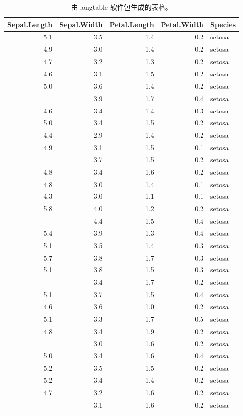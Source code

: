 \documentclass[
  12pt,
]{krantz}
\theoremstyle{definition}
\theoremstyle{definition}
\theoremstyle{definition}
\theoremstyle{definition}
\theoremstyle{remark}
\begin{document}
\begin{longtable}[t]{rrrrl}
\caption{\label{tab:longtable}由 longtable 软件包生成的表格。}\\
\toprule
Sepal.Length & Sepal.Width & Petal.Length & Petal.Width & Species\\
\midrule
5.1 & 3.5 & 1.4 & 0.2 & setosa\\
4.9 & 3.0 & 1.4 & 0.2 & setosa\\
4.7 & 3.2 & 1.3 & 0.2 & setosa\\
4.6 & 3.1 & 1.5 & 0.2 & setosa\\
5.0 & 3.6 & 1.4 & 0.2 & setosa\\
\addlinespace
5.4 & 3.9 & 1.7 & 0.4 & setosa\\
4.6 & 3.4 & 1.4 & 0.3 & setosa\\
5.0 & 3.4 & 1.5 & 0.2 & setosa\\
4.4 & 2.9 & 1.4 & 0.2 & setosa\\
4.9 & 3.1 & 1.5 & 0.1 & setosa\\
\addlinespace
5.4 & 3.7 & 1.5 & 0.2 & setosa\\
4.8 & 3.4 & 1.6 & 0.2 & setosa\\
4.8 & 3.0 & 1.4 & 0.1 & setosa\\
4.3 & 3.0 & 1.1 & 0.1 & setosa\\
5.8 & 4.0 & 1.2 & 0.2 & setosa\\
\addlinespace
5.7 & 4.4 & 1.5 & 0.4 & setosa\\
5.4 & 3.9 & 1.3 & 0.4 & setosa\\
5.1 & 3.5 & 1.4 & 0.3 & setosa\\
5.7 & 3.8 & 1.7 & 0.3 & setosa\\
5.1 & 3.8 & 1.5 & 0.3 & setosa\\
\addlinespace
5.4 & 3.4 & 1.7 & 0.2 & setosa\\
5.1 & 3.7 & 1.5 & 0.4 & setosa\\
4.6 & 3.6 & 1.0 & 0.2 & setosa\\
5.1 & 3.3 & 1.7 & 0.5 & setosa\\
4.8 & 3.4 & 1.9 & 0.2 & setosa\\
\addlinespace
5.0 & 3.0 & 1.6 & 0.2 & setosa\\
5.0 & 3.4 & 1.6 & 0.4 & setosa\\
5.2 & 3.5 & 1.5 & 0.2 & setosa\\
5.2 & 3.4 & 1.4 & 0.2 & setosa\\
4.7 & 3.2 & 1.6 & 0.2 & setosa\\
\addlinespace
4.8 & 3.1 & 1.6 & 0.2 & setosa\\

\end{longtable}
\end{document}
